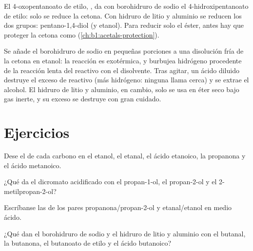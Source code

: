 \begin{example}[Un cetoéster]\label{ex:b1:organic-redox:ketoester}
El 4-oxopentanoato de etilo, , da con borohidruro de
sodio el 4-hidroxipentanoato de etilo: solo se reduce la cetona. Con
hidruro de litio y aluminio se reducen los dos grupos: pentano-1,4-diol
(y etanol). Para reducir solo el éster, antes hay que proteger la cetona
como  (\cref{ch:b1:acetals-protection}).
\end{example}

\begin{inthelab}
Se añade el borohidruro de sodio en pequeñas porciones a una disolución
fría de la cetona en etanol: la reacción es exotérmica, y burbujea
hidrógeno procedente de la reacción lenta del reactivo con el disolvente.
Tras agitar, un ácido diluido destruye el exceso de reactivo (más
hidrógeno: ninguna llama cerca) y se extrae el alcohol. El hidruro de
litio y aluminio, en cambio, solo se usa en éter seco bajo gas inerte, y
su exceso se destruye con gran cuidado.
\end{inthelab}

\section{Ejercicios}

\begin{exercise}[$\star$]\label{exo:b1:organic-redox:1}
Dese el  de cada carbono en el etanol, el etanal, el
ácido etanoico, la propanona y el ácido metanoico.
\end{exercise}

\begin{exercise}[$\star$]\label{exo:b1:organic-redox:2}
¿Qué da el dicromato acidificado con el propan-1-ol, el propan-2-ol y el
2-metilpropan-2-ol?
\end{exercise}

\begin{exercise}[$\star$]\label{exo:b1:organic-redox:3}
Escríbanse las  de los pares propanona/propan-2-ol y
etanal/etanol en medio ácido.
\end{exercise}

\begin{exercise}[$\star$]\label{exo:b1:organic-redox:4}
¿Qué dan el borohidruro de sodio y el hidruro de litio y aluminio con el
butanal, la butanona, el butanoato de etilo y el ácido butanoico?
\end{exercise}

